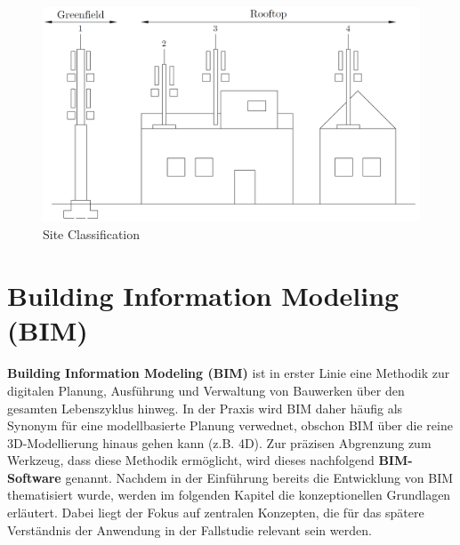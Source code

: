 \begin{figure}[h]
    \centering
    \includegraphics[width=1\textwidth]{dwg/site_classification.PNG}
    \caption{Site Classification}
    \label{fig:site_classification}
\end{figure}

\section{Building Information Modeling (BIM)}
\begin{German}
    \textbf{Building Information Modeling (BIM)} ist in erster Linie eine Methodik zur digitalen Planung, Ausführung und Verwaltung von Bauwerken über den gesamten Lebenszyklus hinweg. In der Praxis wird BIM daher häufig als Synonym für eine modellbasierte Planung verwednet, obschon BIM über die reine 3D-Modellierung hinaus gehen kann (z.B. 4D). Zur präzisen Abgrenzung zum Werkzeug, dass diese Methodik ermöglicht, wird dieses nachfolgend \textbf{BIM-Software} genannt.
    Nachdem in der Einführung bereits die Entwicklung von BIM thematisiert wurde, werden im folgenden Kapitel die konzeptionellen Grundlagen erläutert. Dabei liegt der Fokus auf zentralen Konzepten, die für das spätere Verständnis der Anwendung in der Fallstudie relevant sein werden.
\end{German}

